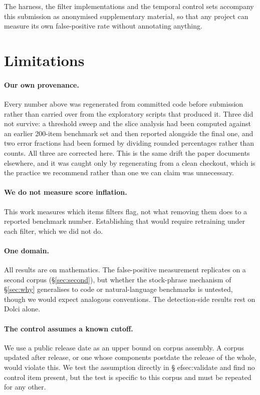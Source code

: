 \documentclass[11pt]{article}
\begin{document}
The harness, the filter implementations and the temporal control sets accompany
this submission as anonymised supplementary material, so that any project can
measure its own false-positive rate without annotating anything.

\section*{Limitations}

\paragraph{Our own provenance.} Every number above was regenerated from
committed code before submission rather than carried over from the exploratory
scripts that produced it. Three did not survive: a threshold sweep and the slice
analysis had been computed against an earlier 200-item benchmark set and then
reported alongside the final one, and two error fractions had been formed by
dividing rounded percentages rather than counts. All three are corrected here.
This is the same drift the paper documents elsewhere, and it was caught only by
regenerating from a clean checkout, which is the practice we recommend rather
than one we can claim was unnecessary.

\label{sec:limits}

\paragraph{We do not measure score inflation.} This work measures which items
filters flag, not what removing them does to a reported benchmark number.
Establishing that would require retraining under each filter, which we did not do.

\paragraph{One domain.} All results are on mathematics. The false-positive
measurement replicates on a second corpus (\S\ref{sec:second}), but whether the
stock-phrase mechanism of \S\ref{sec:why} generalises to code or natural-language
benchmarks is untested, though we would expect analogous conventions. The
detection-side results rest on Dolci alone.

\paragraph{The control assumes a known cutoff.} We use a public release date as an
upper bound on corpus assembly. A corpus updated after release, or one whose
components postdate the release of the whole, would violate this. We test the
assumption directly in \S
ef{sec:validate} and find no control item present, but
the test is specific to this corpus and must be repeated for any other.
\end{document}
